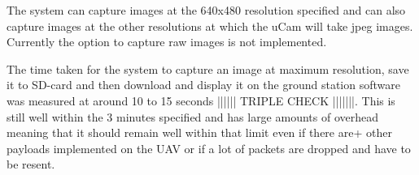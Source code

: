 The system can capture images at the 640x480 resolution specified and can also capture images at the other resolutions at which the uCam will take jpeg images. Currently the option to capture raw images is not implemented.

The time taken for the system to capture an image at maximum resolution, save it to SD-card and then download and display it on the ground station software was measured at around 10 to 15 seconds |||||| TRIPLE CHECK |||||||. This is still well within the 3 minutes specified and has large amounts of overhead meaning that it should remain well within that limit even if there are+ other payloads implemented on the UAV or if a lot of packets are dropped and have to be resent.